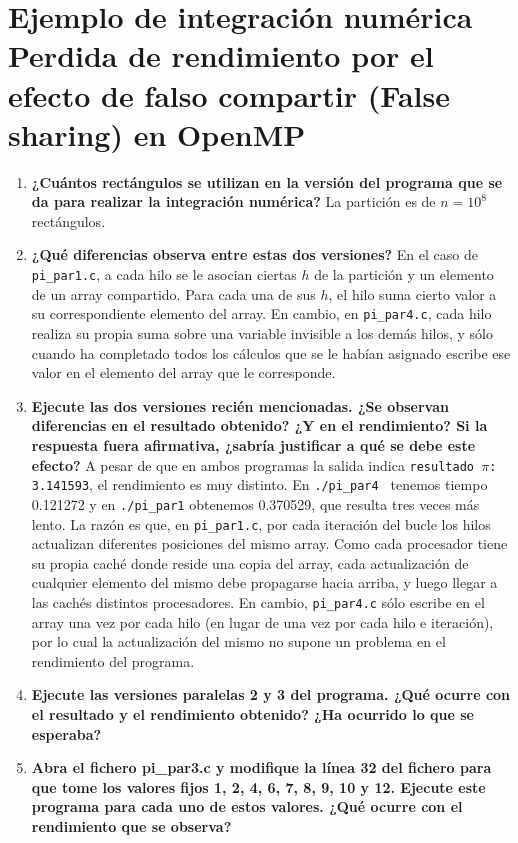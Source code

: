 \documentclass{report}
\newcommand\tab[1][0.6cm]{\hspace*{#1}}
\newcommand\nl{\newline\tab}
\begin{document}
	\section{Ejemplo de integración numérica \newline Perdida de rendimiento por el efecto de falso compartir (False
		sharing) en OpenMP}
	\begin{enumerate}
		\item {\textbf{\tab ¿Cuántos rectángulos se utilizan en la versión del programa que se da para realizar la integración numérica?}\nl
			La partición es de $ n=10^8 $ rectángulos.
		}
		\item {\textbf{\tab ¿Qué diferencias observa entre estas dos versiones?}\nl
			En el caso de \texttt{pi\_par1.c}, a cada hilo se le asocian ciertas $h$ de la partición y un elemento de un array compartido. Para cada una de sus $h$, el hilo suma cierto valor a su correspondiente elemento del array.\nl
			En cambio, en \texttt{pi\_par4.c}, cada hilo realiza su propia suma sobre una variable invisible a los demás hilos, y sólo cuando ha completado todos los cálculos que se le habían asignado escribe ese valor en el elemento del array que le corresponde. 
		}
		\item {\textbf{\tab Ejecute las dos versiones recién mencionadas. ¿Se observan diferencias en el resultado obtenido? ¿Y en el rendimiento? Si la respuesta fuera afirmativa, ¿sabría justificar a qué se debe este efecto?}\nl
			A pesar de que en ambos programas la salida indica \texttt{resultado $\pi$: 3.141593}, el rendimiento es muy distinto. En \texttt{./pi\_par4 } tenemos tiempo 0.121272 y en \texttt{./pi\_par1} obtenemos  0.370529, que resulta tres veces más lento.\nl
			La razón es que, en \texttt{pi\_par1.c}, por cada iteración del bucle los hilos actualizan diferentes posiciones del mismo array. Como cada procesador tiene su propia caché donde reside una copia del array, cada actualización de cualquier elemento del mismo debe propagarse hacia arriba, y luego llegar a las cachés distintos procesadores. En cambio, \texttt{pi\_par4.c} sólo escribe en el array una vez por cada hilo (en lugar de una vez por cada hilo e iteración), por lo cual la actualización del mismo no supone un problema en el rendimiento del programa.
		}
		\item {\textbf{\tab Ejecute las versiones paralelas 2 y 3 del programa. ¿Qué ocurre con el resultado y el rendimiento obtenido? ¿Ha ocurrido lo que se esperaba?}\nl
		}
		\item {\textbf{\tab Abra el fichero pi\_par3.c y modifique la línea 32 del fichero para que tome los valores fijos 1, 2, 4, 6, 7, 8, 9, 10 y 12. Ejecute este programa para cada uno de estos valores. ¿Qué ocurre con el rendimiento que se observa?}\nl
		}
		
		
	\end{enumerate}
	
	
\end{document}
